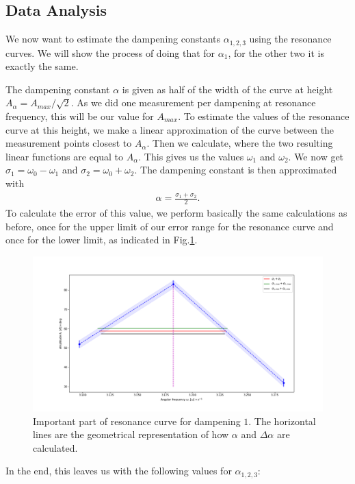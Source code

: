 \subsection{Data Analysis}

We now want to estimate the dampening constants $\alpha_{1, 2, 3}$ using the resonance curves.
We will show the process of doing that for $\alpha_1$, for the other two it is exactly the same.

The dampening constant $\alpha$ is given as half of the width of the curve at height $A_{\alpha} = A_{max}/\sqrt{2}$.
As we did one measurement per dampening at resonance frequency, this will be our value for $A_{max}$.
To estimate the values of the resonance curve at this height, we make a linear approximation of the curve between the measurement points closest to $A_{\alpha}$.
Then we calculate, where the two resulting linear functions are equal to $A_{\alpha}$.
This gives us the values $\omega_1$ and $\omega_2$.
We now get $\sigma_1 = \omega_0 - \omega_1$ and $\sigma_2 = \omega_0 + \omega_2$.
The dampening constant is then approximated with 
\begin{align*}
	\alpha = \frac{\sigma_1 + \sigma_2}{2}.
\end{align*}
To calculate the error of this value, we perform basically the same calculations as before, once for the upper limit of our error range for the resonance curve and once for the lower limit, as indicated in Fig.\ref{fig::res_calc}.
\begin{figure} [ht]
	\centering
	\includegraphics[width=500pt]{python/res_calc.PNG}
	\caption{Important part of resonance curve for dampening $1$. The horizontal lines are the geometrical representation of how $\alpha$ and $\Delta \alpha$ are calculated.}
	\label{fig::res_calc}
\end{figure}

In the end, this leaves us with the following values for $\alpha_{1, 2, 3}$:

